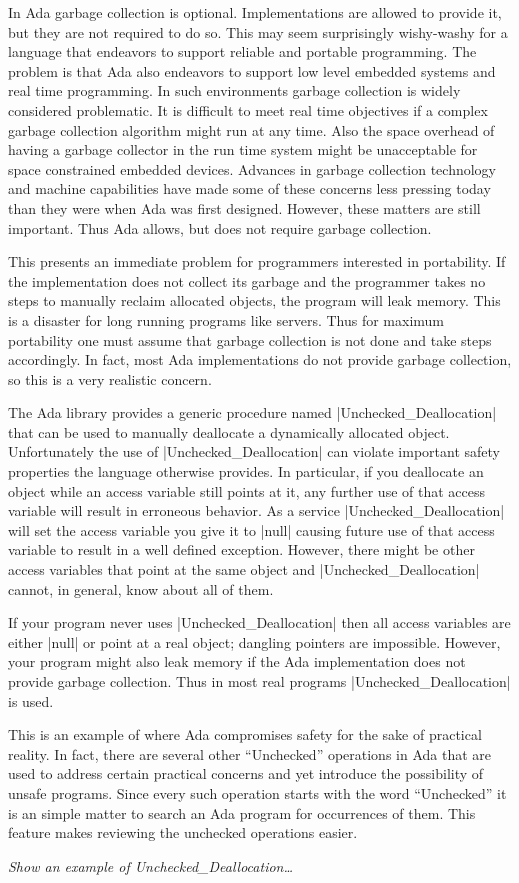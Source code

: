 In Ada garbage collection is optional. Implementations are allowed to provide it, but they are
not required to do so. This may seem surprisingly wishy-washy for a language that endeavors to
support reliable and portable programming. The problem is that Ada also endeavors to support low
level embedded systems and real time programming. In such environments garbage collection is
widely considered problematic. It is difficult to meet real time objectives if a complex garbage
collection algorithm might run at any time. Also the space overhead of having a garbage
collector in the run time system might be unacceptable for space constrained embedded devices.
Advances in garbage collection technology and machine capabilities have made some of these
concerns less pressing today than they were when Ada was first designed. However, these matters
are still important. Thus Ada allows, but does not require garbage collection.

This presents an immediate problem for programmers interested in portability. If the
implementation does not collect its garbage and the programmer takes no steps to manually
reclaim allocated objects, the program will leak memory. This is a disaster for long running
programs like servers. Thus for maximum portability one must assume that garbage collection is
not done and take steps accordingly. In fact, most Ada implementations do not provide garbage
collection, so this is a very realistic concern.

The Ada library provides a generic procedure named |Unchecked_Deallocation| that can be used to
manually deallocate a dynamically allocated object. Unfortunately the use of
|Unchecked_Deallocation| can violate important safety properties the language otherwise
provides. In particular, if you deallocate an object while an access variable still points at
it, any further use of that access variable will result in erroneous behavior. As a service
|Unchecked_Deallocation| will set the access variable you give it to |null| causing future use
of that access variable to result in a well defined exception. However, there might be other
access variables that point at the same object and |Unchecked_Deallocation| cannot, in general,
know about all of them.

If your program never uses |Unchecked_Deallocation| then all access variables are either |null|
or point at a real object; dangling pointers are impossible. However, your program might also
leak memory if the Ada implementation does not provide garbage collection. Thus in most real
programs |Unchecked_Deallocation| is used.

This is an example of where Ada compromises safety for the sake of practical reality. In fact,
there are several other ``Unchecked'' operations in Ada that are used to address certain
practical concerns and yet introduce the possibility of unsafe programs. Since every such
operation starts with the word ``Unchecked'' it is an simple matter to search an Ada program for
occurrences of them. This feature makes reviewing the unchecked operations easier.

\textit{Show an example of Unchecked\_Deallocation\ldots}

